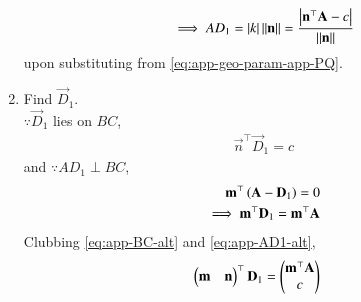 \begin{enumerate}[label=\thesubsection.\arabic*.,ref=\thesubsection.\theenumi]
\begin{align}
	\implies AD_1 =\left\vert k\right\vert  
		\left\lVert\mathbf{n}\right\rVert	=
	\frac{\left\vert\mathbf{n}^{\top}\mathbf{A} - c\right\vert}{\left\lVert\mathbf{n}\right\rVert}
			\label{eq:app-PQ-final}
\end{align}
upon substituting from 
			\eqref{eq:app-geo-param-app-PQ}.
  \item Find $\vec{D}_1$.
	  \\
		\solution $\because \vec{D}_1$ lies on $BC$, 
\begin{align}
			\label{eq:app-BC-alt}
\vec{n}^\top\vec{D}_1 =c
\end{align}
and 
	$\because AD_1 \perp BC$,
\begin{align}
	\mathbf{m}^{\top}\left(\mathbf{A}-\mathbf{D}_1\right) = 0
	\\
	\implies 
	\mathbf{m}^{\top}\mathbf{D}_1 = 
	\mathbf{m}^{\top}\mathbf{A}
			\label{eq:app-AD1-alt}
\end{align}
Clubbing
			\eqref{eq:app-BC-alt}
			and 
			\eqref{eq:app-AD1-alt},
\begin{align}
			\label{eq:app-D1-alt}
	\begin{pmatrix}\mathbf{m} & \mathbf{n}\end{pmatrix}^\top\mathbf{D}_1 &= 
	   \begin{pmatrix}
              \mathbf{m}^\top\mathbf{A}\\
	      c
	      \end{pmatrix}
\end{align}
\fi
\end{enumerate}
